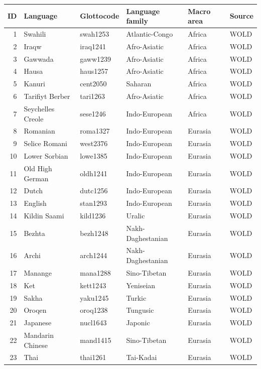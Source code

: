 \begin{table}[ht]
\centering
\begin{tabular}{rlllll}
  \hline
ID & Language & Glottocode & Language family & Macro area & Source \\ 
  \hline
1 & Swahili & swah1253 & Atlantic-Congo & Africa & WOLD \\ 
  2 & Iraqw & iraq1241 & Afro-Asiatic & Africa & WOLD \\ 
  3 & Gawwada & gaww1239 & Afro-Asiatic & Africa & WOLD \\ 
  4 & Hausa & haus1257 & Afro-Asiatic & Africa & WOLD \\ 
  5 & Kanuri & cent2050 & Saharan & Africa & WOLD \\ 
  6 & Tarifiyt Berber & tari1263 & Afro-Asiatic & Africa & WOLD \\ 
  7 & Seychelles Creole & sese1246 & Indo-European & Africa & WOLD \\ 
  8 & Romanian & roma1327 & Indo-European & Eurasia & WOLD \\ 
  9 & Selice Romani & west2376 & Indo-European & Eurasia & WOLD \\ 
  10 & Lower Sorbian & lowe1385 & Indo-European & Eurasia & WOLD \\ 
  11 & Old High German & oldh1241 & Indo-European & Eurasia & WOLD \\ 
  12 & Dutch & dutc1256 & Indo-European & Eurasia & WOLD \\ 
  13 & English & stan1293 & Indo-European & Eurasia & WOLD \\ 
  14 & Kildin Saami & kild1236 & Uralic & Eurasia & WOLD \\ 
  15 & Bezhta & bezh1248 & Nakh-Daghestanian & Eurasia & WOLD \\ 
  16 & Archi & arch1244 & Nakh-Daghestanian & Eurasia & WOLD \\ 
  17 & Manange & mana1288 & Sino-Tibetan & Eurasia & WOLD \\ 
  18 & Ket & kett1243 & Yeniseian & Eurasia & WOLD \\ 
  19 & Sakha & yaku1245 & Turkic & Eurasia & WOLD \\ 
  20 & Oroqen & oroq1238 & Tungusic & Eurasia & WOLD \\ 
  21 & Japanese & nucl1643 & Japonic & Eurasia & WOLD \\ 
  22 & Mandarin Chinese & mand1415 & Sino-Tibetan & Eurasia & WOLD \\ 
  23 & Thai & thai1261 & Tai-Kadai & Eurasia & WOLD \\ 

\end{tabular}
\end{table}
